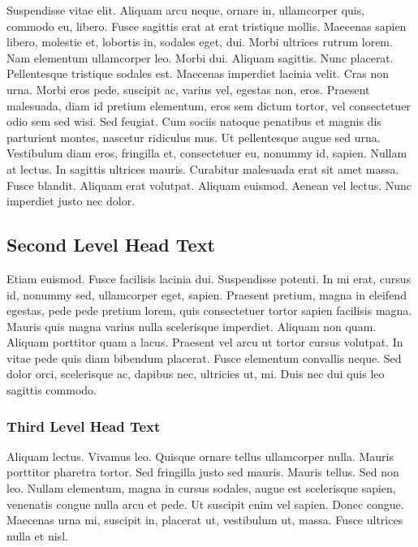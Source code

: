 \documentclass{wber}
\begin{document}
Suspendisse vitae elit. Aliquam arcu neque, ornare in, ullamcorper quis, commodo eu, libero. Fusce sagittis erat at
erat tristique mollis. Maecenas sapien libero, molestie et, lobortis in, sodales eget, dui. Morbi ultrices rutrum lorem.
Nam elementum ullamcorper leo. Morbi dui. Aliquam sagittis. Nunc placerat. Pellentesque tristique sodales est.
Maecenas imperdiet lacinia velit. Cras non urna. Morbi eros pede, suscipit ac, varius vel, egestas non, eros. Praesent
malesuada, diam id pretium elementum, eros sem dictum tortor, vel consectetuer odio sem sed wisi. Sed feugiat. Cum sociis natoque penatibus et magnis dis parturient montes, nascetur ridiculus mus. Ut pellentesque
augue sed urna. Vestibulum diam eros, fringilla et, consectetuer eu, nonummy id, sapien. Nullam at lectus. In sagittis
ultrices mauris. Curabitur malesuada erat sit amet massa. Fusce blandit. Aliquam erat volutpat. Aliquam euismod.
Aenean vel lectus. Nunc imperdiet justo nec dolor.

\subsection{Second Level Head Text}

Etiam euismod. Fusce facilisis lacinia dui. Suspendisse potenti. In mi erat, cursus id, nonummy sed, ullamcorper
eget, sapien. Praesent pretium, magna in eleifend egestas, pede pede pretium lorem, quis consectetuer tortor sapien
facilisis magna. Mauris quis magna varius nulla scelerisque imperdiet. Aliquam non quam. Aliquam porttitor quam
a lacus. Praesent vel arcu ut tortor cursus volutpat. In vitae pede quis diam bibendum placerat. Fusce elementum
convallis neque. Sed dolor orci, scelerisque ac, dapibus nec, ultricies ut, mi. Duis nec dui quis leo sagittis commodo.


\subsubsection{Third Level Head Text}

Aliquam lectus. Vivamus leo. Quisque ornare tellus ullamcorper nulla. Mauris porttitor pharetra tortor. Sed fringilla
justo sed mauris. Mauris tellus. Sed non leo. Nullam elementum, magna in cursus sodales, augue est scelerisque
sapien, venenatis congue nulla arcu et pede. Ut suscipit enim vel sapien. Donec congue. Maecenas urna mi, suscipit
in, placerat ut, vestibulum ut, massa. Fusce ultrices nulla et nisl.
\end{document}
